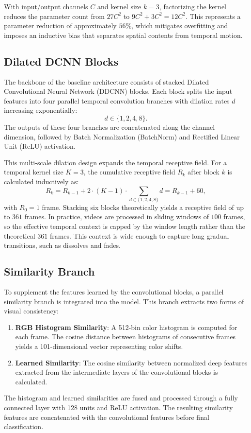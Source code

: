 With input/output channels $C$ and kernel size $k=3$, factorizing the kernel reduces the parameter count from $27C^2$ to $9C^2 + 3C^2 = 12C^2$. This represents a parameter reduction of approximately $56\%$, which mitigates overfitting and imposes an inductive bias that separates spatial contents from temporal motion.

\subsection{Dilated DCNN Blocks}

The backbone of the baseline architecture consists of stacked Dilated Convolutional Neural Network (DDCNN) blocks. Each block splits the input features into four parallel temporal convolution branches with dilation rates $d$ increasing exponentially:
\begin{equation}
    d \in \{1, 2, 4, 8\}.
\end{equation}
The outputs of these four branches are concatenated along the channel dimension, followed by Batch Normalization (BatchNorm) and Rectified Linear Unit (ReLU) activation.

This multi-scale dilation design expands the temporal receptive field. For a temporal kernel size $K=3$, the cumulative receptive field $R_k$ after block $k$ is calculated inductively as:
\begin{equation}
    R_k = R_{k-1} + 2 \cdot (K - 1) \cdot \sum_{d \in \{1,2,4,8\}} d = R_{k-1} + 60,
\end{equation}
with $R_0 = 1$ frame. Stacking six blocks theoretically yields a receptive field of up to $361$ frames. In practice, videos are processed in sliding windows of $100$ frames, so the effective temporal context is capped by the window length rather than the theoretical $361$ frames. This context is wide enough to capture long gradual transitions, such as dissolves and fades.

\subsection{Similarity Branch}

To supplement the features learned by the convolutional blocks, a parallel similarity branch is integrated into the model. This branch extracts two forms of visual consistency:
\begin{enumerate}
    \item \textbf{RGB Histogram Similarity}: A 512-bin color histogram is computed for each frame. The cosine distance between histograms of consecutive frames yields a 101-dimensional vector representing color shifts.
    \item \textbf{Learned Similarity}: The cosine similarity between normalized deep features extracted from the intermediate layers of the convolutional blocks is calculated.
\end{enumerate}
The histogram and learned similarities are fused and processed through a fully connected layer with 128 units and ReLU activation. The resulting similarity features are concatenated with the convolutional features before final classification.

